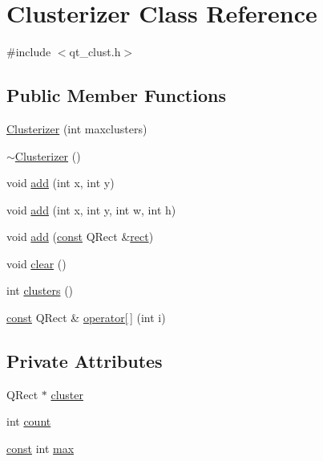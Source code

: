 \hypertarget{classClusterizer}{\section{Clusterizer Class Reference}
\label{classClusterizer}
}


{\ttfamily \#include $<$qt\+\_\+clust.\+h$>$}

\subsection*{Public Member Functions}
\begin{DoxyCompactItemize}
\item 
\hyperlink{classClusterizer_aa7d28e6fd0e6cb29aceb0931509c03d2}{Clusterizer} (int maxclusters)
\item 
\hyperlink{classClusterizer_aa43e94adc9a05abea09f31ec02e4bb81}{$\sim$\+Clusterizer} ()
\item 
void \hyperlink{classClusterizer_a56ad2f3310bf041b3df3d4a752d8a8f4}{add} (int x, int y)
\item 
void \hyperlink{classClusterizer_a76ad86dd8c777a16932d88e95b2cd492}{add} (int x, int y, int w, int h)
\item 
void \hyperlink{classClusterizer_a2d46b9d22f23770dcef7ba929fcfb628}{add} (\hyperlink{tradstdc_8h_a2c212835823e3c54a8ab6d95c652660e}{const} Q\+Rect \&\hyperlink{rect_8c_a58a1301fcdb736034a47900ee20578ec}{rect})
\item 
void \hyperlink{classClusterizer_a768c6b7a54cc999c9347ca5c37687d92}{clear} ()
\item 
int \hyperlink{classClusterizer_aa9e463f138979e1b4dfa5a6d9bb59f9e}{clusters} ()
\item 
\hyperlink{tradstdc_8h_a2c212835823e3c54a8ab6d95c652660e}{const} Q\+Rect \& \hyperlink{classClusterizer_a7a39a010c66b6988ca3385b5bbe30b57}{operator\mbox{[}$\,$\mbox{]}} (int i)
\end{DoxyCompactItemize}
\subsection*{Private Attributes}
\begin{DoxyCompactItemize}
\item 
Q\+Rect $\ast$ \hyperlink{classClusterizer_a7e624eaa105d802d545b978e43b13001}{cluster}
\item 
int \hyperlink{classClusterizer_aeeae38da5c079b420b7c129822d29e0a}{count}
\item 
\hyperlink{tradstdc_8h_a2c212835823e3c54a8ab6d95c652660e}{const} int \hyperlink{classClusterizer_ac83388e1efbfb7f0129b5d3700791c67}{max}
\end{DoxyCompactItemize}


